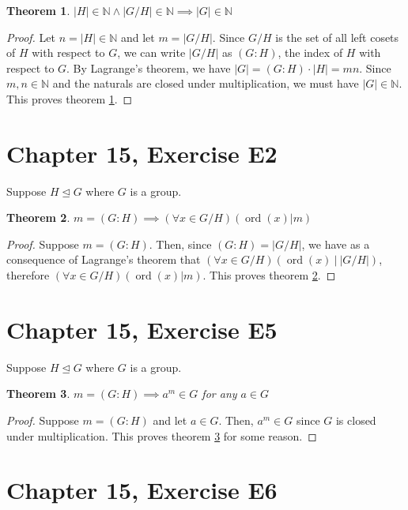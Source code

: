 \documentclass[12pt]{article}
\newcommand{\nats}{\mathbb{N}}
\newcommand{\ord}{\operatorname{ord}}
\newtheorem{thm}{Theorem}
\begin{document}
\begin{thm} \label{thm2}
	$|H| \in \nats \land |G/H| \in \nats \implies |G| \in \nats$
\end{thm}

\begin{proof}
	Let $n = |H| \in \nats$ and let $m = |G/H|$.
	Since $G/H$ is the set of all left cosets of $H$ with respect to $G$,
	we can write $|G/H|$ as $(G:H)$, the index of $H$ with respect to $G$.
	By Lagrange's theorem, we have $|G| = (G:H) \cdot |H| = mn$.
	Since $m,n \in \nats$ and the naturals are closed under multiplication,
	we must have $|G| \in \nats$.
	This proves theorem \ref{thm2}.
\end{proof}

\section{Chapter 15, Exercise E2}

Suppose $H \trianglelefteq G$ where $G$ is a group.

\begin{thm} \label{thm3}
	$m = (G:H) \implies (\forall x \in G/H)( \ord(x) | m )$
\end{thm}

\begin{proof}
	Suppose $m = (G:H)$.
	Then, since $(G:H) = |G/H|$,
	we have as a consequence of
	Lagrange's theorem that
	$(\forall x \in G/H)(\ord(x)\ |\ |G/H|)$,
	therefore $(\forall x \in G/H)(\ord(x) | m)$.
	This proves theorem \ref{thm3}.
\end{proof}

\section{Chapter 15, Exercise E5}

Suppose $H \trianglelefteq G$ where $G$ is a group.

\begin{thm} \label{thm4}
	$m = (G:H) \implies a^m \in G$ for any $a \in G$
\end{thm}
\begin{proof}
	Suppose $m = (G:H)$ and
	let $a \in G$.
	Then, $a^m \in G$ since $G$ is
	closed under multiplication.
	This proves theorem \ref{thm4} for some reason.
\end{proof}

\section{Chapter 15, Exercise E6}
\end{document}
